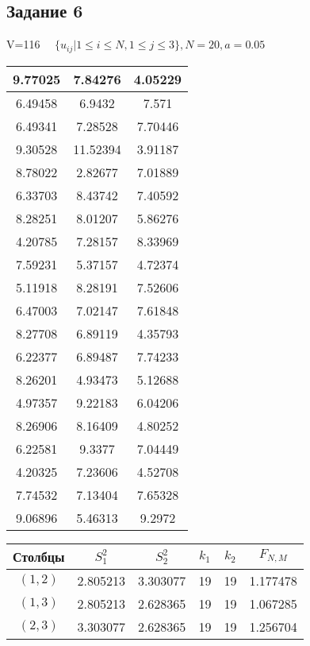 \subsection{Задание 6}%
\label{subsec:6}%
%
V=116%
$\quad \{ u_{ij}|1 \le i \le N, 1\le j \le 3 \}, N=20, a =0.05 $

%
\begin{changemargin}{0cm}{0cm}\small{%
\center%
\begin{tabular}{|c|c|c|}%
\hline%
9.77025&7.84276&4.05229\\%
\hline%
6.49458&6.9432&7.571\\%
\hline%
6.49341&7.28528&7.70446\\%
\hline%
9.30528&11.52394&3.91187\\%
\hline%
8.78022&2.82677&7.01889\\%
\hline%
6.33703&8.43742&7.40592\\%
\hline%
8.28251&8.01207&5.86276\\%
\hline%
4.20785&7.28157&8.33969\\%
\hline%
7.59231&5.37157&4.72374\\%
\hline%
5.11918&8.28191&7.52606\\%
\hline%
6.47003&7.02147&7.61848\\%
\hline%
8.27708&6.89119&4.35793\\%
\hline%
6.22377&6.89487&7.74233\\%
\hline%
8.26201&4.93473&5.12688\\%
\hline%
4.97357&9.22183&6.04206\\%
\hline%
8.26906&8.16409&4.80252\\%
\hline%
6.22581&9.3377&7.04449\\%
\hline%
4.20325&7.23606&4.52708\\%
\hline%
7.74532&7.13404&7.65328\\%
\hline%
9.06896&5.46313&9.2972\\%
\hline%
\end{tabular}%
\newline%
\newline%
%
}\end{changemargin}%
\begin{changemargin}{-1.5cm}{0cm}\small{%
\center%
\begin{tabular}{|c|c|c|c|c|c|}%
\hline%
Столбцы&$S_{1}^2$&$S_{2}^2$&$k_1$&$k_2$&$F_{N,M}$\\%
\hline%
$(1,2)$&2.805213&3.303077&19&19&1.177478\\%
\hline%
$(1,3)$&2.805213&2.628365&19&19&1.067285\\%
\hline%
$(2,3)$&3.303077&2.628365&19&19&1.256704\\%
\hline%
\end{tabular}%
\newline%
\newline%
%
}\end{changemargin}%
